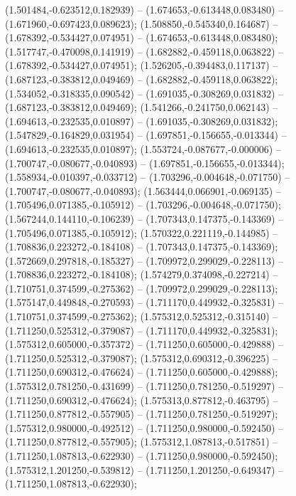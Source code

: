  (1.501484,-0.623512,0.182939) -- (1.674653,-0.613448,0.083480) -- (1.671960,-0.697423,0.089623);
 (1.508850,-0.545340,0.164687) -- (1.678392,-0.534427,0.074951) -- (1.674653,-0.613448,0.083480);
 (1.517747,-0.470098,0.141919) -- (1.682882,-0.459118,0.063822) -- (1.678392,-0.534427,0.074951);
 (1.526205,-0.394483,0.117137) -- (1.687123,-0.383812,0.049469) -- (1.682882,-0.459118,0.063822);
 (1.534052,-0.318335,0.090542) -- (1.691035,-0.308269,0.031832) -- (1.687123,-0.383812,0.049469);
 (1.541266,-0.241750,0.062143) -- (1.694613,-0.232535,0.010897) -- (1.691035,-0.308269,0.031832);
 (1.547829,-0.164829,0.031954) -- (1.697851,-0.156655,-0.013344) -- (1.694613,-0.232535,0.010897);
 (1.553724,-0.087677,-0.000006) -- (1.700747,-0.080677,-0.040893) -- (1.697851,-0.156655,-0.013344);
 (1.558934,-0.010397,-0.033712) -- (1.703296,-0.004648,-0.071750) -- (1.700747,-0.080677,-0.040893);
 (1.563444,0.066901,-0.069135) -- (1.705496,0.071385,-0.105912) -- (1.703296,-0.004648,-0.071750);
 (1.567244,0.144110,-0.106239) -- (1.707343,0.147375,-0.143369) -- (1.705496,0.071385,-0.105912);
 (1.570322,0.221119,-0.144985) -- (1.708836,0.223272,-0.184108) -- (1.707343,0.147375,-0.143369);
 (1.572669,0.297818,-0.185327) -- (1.709972,0.299029,-0.228113) -- (1.708836,0.223272,-0.184108);
 (1.574279,0.374098,-0.227214) -- (1.710751,0.374599,-0.275362) -- (1.709972,0.299029,-0.228113);
 (1.575147,0.449848,-0.270593) -- (1.711170,0.449932,-0.325831) -- (1.710751,0.374599,-0.275362);
 (1.575312,0.525312,-0.315140) -- (1.711250,0.525312,-0.379087) -- (1.711170,0.449932,-0.325831);
 (1.575312,0.605000,-0.357372) -- (1.711250,0.605000,-0.429888) -- (1.711250,0.525312,-0.379087);
 (1.575312,0.690312,-0.396225) -- (1.711250,0.690312,-0.476624) -- (1.711250,0.605000,-0.429888);
 (1.575312,0.781250,-0.431699) -- (1.711250,0.781250,-0.519297) -- (1.711250,0.690312,-0.476624);
 (1.575313,0.877812,-0.463795) -- (1.711250,0.877812,-0.557905) -- (1.711250,0.781250,-0.519297);
 (1.575312,0.980000,-0.492512) -- (1.711250,0.980000,-0.592450) -- (1.711250,0.877812,-0.557905);
 (1.575312,1.087813,-0.517851) -- (1.711250,1.087813,-0.622930) -- (1.711250,0.980000,-0.592450);
 (1.575312,1.201250,-0.539812) -- (1.711250,1.201250,-0.649347) -- (1.711250,1.087813,-0.622930);
